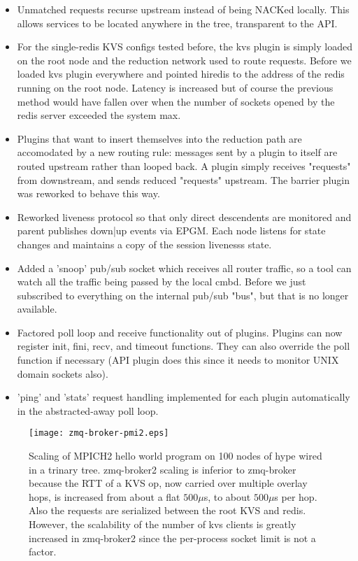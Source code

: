 \begin{itemize}
\item{Unmatched requests recurse upstream instead of being NACKed locally.
  This allows services to be located anywhere in the tree, transparent to
  the API.}

\item{For the single-redis KVS configs tested before, the kvs plugin is simply
  loaded on the root node and the reduction network used to route requests.
  Before we loaded kvs plugin everywhere and pointed hiredis to the address of
  the redis running on the root node.  Latency is increased but of course
  the previous method would have fallen over when the number of sockets
  opened by the redis server exceeded the system max.}

\item{Plugins that want to insert themselves into the reduction path are
  accomodated by a new routing rule:  messages sent by a plugin to itself
  are routed upstream rather than looped back.   A plugin simply receives
  "requests" from downstream, and sends reduced "requests" upstream.
  The barrier plugin was reworked to behave this way.}

\item{Reworked liveness protocol so that only direct descendents are monitored
  and parent publishes down|up events via EPGM.  Each node listens for
  state changes and maintains a copy of the session livenesss state.}

\item{Added a 'snoop' pub/sub socket which receives all router traffic,
  so a tool can watch all the traffic being passed by the local cmbd.
  Before we just subscribed to everything on the internal pub/sub "bus",
  but that is no longer available.}

\item{Factored poll loop and receive functionality out of plugins.
  Plugins can now register init, fini, recv, and timeout functions.
  They can also override the poll function if necessary (API plugin does
  this since it needs to monitor UNIX domain sockets also).}

\item{'ping' and 'stats' request handling implemented for each plugin
  automatically in the abstracted-away poll loop.}
\end{itemize}

\begin{figure}
\centering
\texttt{[image: zmq-broker-pmi2.eps]}
\caption{Scaling of MPICH2 hello world program on 100 nodes of hype wired
in a trinary tree.  zmq-broker2 scaling is inferior to zmq-broker because
the RTT of a KVS op, now carried over multiple overlay hops,
is increased from about a flat $500\mu$s, to about $500\mu$s per hop.
Also the requests are serialized between the root KVS and redis.
However, the scalability of the number of kvs clients is greatly increased
in zmq-broker2 since the per-process socket limit is not a factor.}
\label{fig:cmb2scale}
\end{figure}

